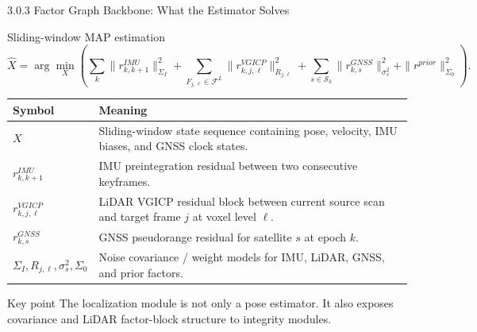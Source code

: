 \documentclass[10pt,aspectratio=169,xcolor=dvipsnames]{beamer}
\newcommand{\Fset}{\mathcal{F}}
\newcommand{\Sset}{\mathcal{S}}
\begin{document}

\begin{frame}{3.0.3 Factor Graph Backbone: What the Estimator Solves}
  \small
  \begin{block}{Sliding-window MAP estimation}
    \vspace{-4pt}
    \[
      \hat{X}=\arg\min_X
      \left(
        \sum_k\|r^{IMU}_{k,k+1}\|^2_{\Sigma_I}
        +\sum_{F_{j,\ell}\in\Fset^L}\|r^{VGICP}_{k,j,\ell}\|^2_{R_{j,\ell}}
        +\sum_{s\in\Sset_k}\|r^{GNSS}_{k,s}\|^2_{\sigma^2_{s}}
        +\|r^{prior}\|^2_{\Sigma_0}
      \right).
    \]
  \end{block}

  \vspace{-2pt}
  \begin{table}\scriptsize
    \begin{tabular}{p{} p{}}
      \toprule
      \textbf{Symbol} & \textbf{Meaning}\\
      \midrule
      $X$ & Sliding-window state sequence containing pose, velocity, IMU biases, and GNSS clock states.\\
      $r^{IMU}_{k,k+1}$ & IMU preintegration residual between two consecutive keyframes.\\
      $r^{VGICP}_{k,j,\ell}$ & LiDAR VGICP residual block between current source scan and target frame $j$ at voxel level $\ell$.\\
      $r^{GNSS}_{k,s}$ & GNSS pseudorange residual for satellite $s$ at epoch $k$.\\
      $\Sigma_I,R_{j,\ell},\sigma_s^2,\Sigma_0$ & Noise covariance / weight models for IMU, LiDAR, GNSS, and prior factors.\\
      \bottomrule
    \end{tabular}
  \end{table}

  \begin{alertblock}{Key point}
    \footnotesize The localization module is not only a pose estimator. It also exposes covariance and LiDAR factor-block structure to integrity modules.
  \end{alertblock}
\end{frame}
\end{document}
